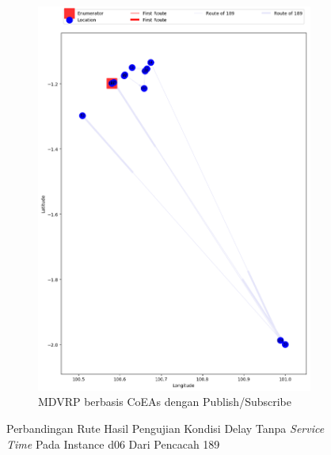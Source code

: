 \begin{figure}[H]\ContinuedFloat
	\centering
	\begin{subfigure}[t]{\textwidth}
		\centering
		\includegraphics[width=\textwidth]{Resources/Images/delayed_6/real_m15_n100_delayed_6_189_pubsub_coes}
		\caption{MDVRP berbasis CoEAs dengan Publish/Subscribe}
		\label{fig:real_m15_n100_delayed_6_189_pubsub_coes}
	\end{subfigure}
	\caption{Perbandingan Rute Hasil Pengujian Kondisi Delay Tanpa \textit{Service Time} Pada Instance d06 Dari Pencacah 189}
	\label{fig:real_m15_n100_delayed_6_189_contd}
\end{figure}


